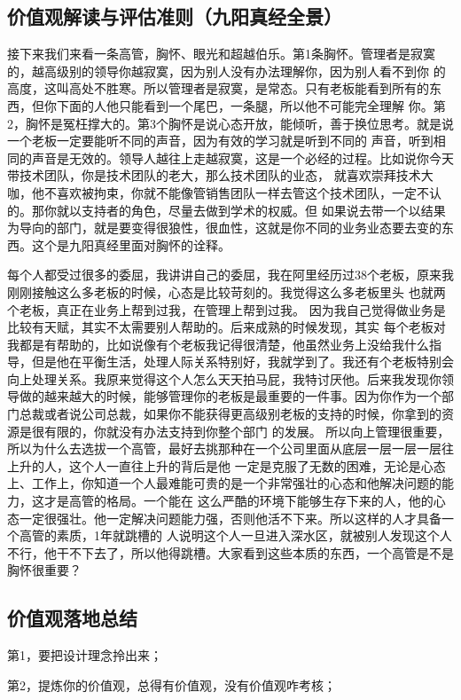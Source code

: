\documentclass[12pt]{article}
\begin{document}
\subsection{价值观解读与评估准则（九阳真经全景）}
接下来我们来看一条高管，胸怀、眼光和超越伯乐。第1条胸怀。管理者是寂寞的，越高级别的领导你越寂寞，因为别人没有办法理解你，因为别人看不到你 的高度，这叫高处不胜寒。所以管理者是寂寞，是常态。只有老板能看到所有的东西，但你下面的人他只能看到一个尾巴，一条腿，所以他不可能完全理解 你。第2，胸怀是冤枉撑大的。第3个胸怀是说心态开放，能倾听，善于换位思考。就是说一个老板一定要能听不同的声音，因为有效的学习就是听到不同的 声音，听到相同的声音是无效的。领导人越往上走越寂寞，这是一个必经的过程。比如说你今天带技术团队，你是技术团队的老大，那么技术团队的业态， 就喜欢崇拜技术大咖，他不喜欢被拘束，你就不能像管销售团队一样去管这个技术团队，一定不认的。那你就以支持者的角色，尽量去做到学术的权威。但 如果说去带一个以结果为导向的部门，就是要变得很狼性，很血性，这就是你不同的业务业态要去变的东西。这个是九阳真经里面对胸怀的诠释。

每个人都受过很多的委屈，我讲讲自己的委屈，我在阿里经历过38个老板，原来我刚刚接触这么多老板的时候，心态是比较苛刻的。我觉得这么多老板里头 也就两个老板，真正在业务上帮到过我，在管理上帮到过我。 因为我自己觉得做业务是比较有天赋，其实不太需要别人帮助的。后来成熟的时候发现，其实 每个老板对我都是有帮助的，比如说像有个老板我记得很清楚，他虽然业务上没给我什么指导，但是他在平衡生活，处理人际关系特别好，我就学到了。我还有个老板特别会向上处理关系。我原来觉得这个人怎么天天拍马屁，我特讨厌他。后来我发现你领导做的越来越大的时候，能够管理你的老板是最重要的一件事。因为你作为一个部门总裁或者说公司总裁，如果你不能获得更高级别老板的支持的时候，你拿到的资源是很有限的，你就没有办法支持到你整个部门 的发展。 所以向上管理很重要，所以为什么去选拔一个高管，最好去挑那种在一个公司里面从底层一层一层一层往上升的人，这个人一直往上升的背后是他 一定是克服了无数的困难，无论是心态上、工作上，你知道一个人最难能可贵的是一个非常强壮的心态和他解决问题的能力，这才是高管的格局。一个能在 这么严酷的环境下能够生存下来的人，他的心态一定很强壮。他一定解决问题能力强，否则他活不下来。所以这样的人才具备一个高管的素质，1年就跳槽的 人说明这个人一旦进入深水区，就被别人发现这个人不行，他干不下去了，所以他得跳槽。大家看到这些本质的东西，一个高管是不是胸怀很重要？

\subsection{价值观落地总结}
第1，要把设计理念拎出来；

第2，提炼你的价值观，总得有价值观，没有价值观咋考核；
\end{document}

